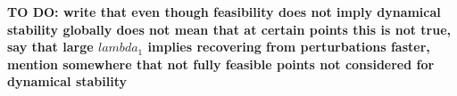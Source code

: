 \documentclass[12pt, titlepage]{report}
\begin{document}
%

\textbf{TO DO: write that even though feasibility does not imply dynamical stability globally does not mean that at certain points this is not true, say that large $lambda_1$ implies recovering from perturbations faster, mention somewhere that not fully feasible points not considered for dynamical stability}
\end{document}
